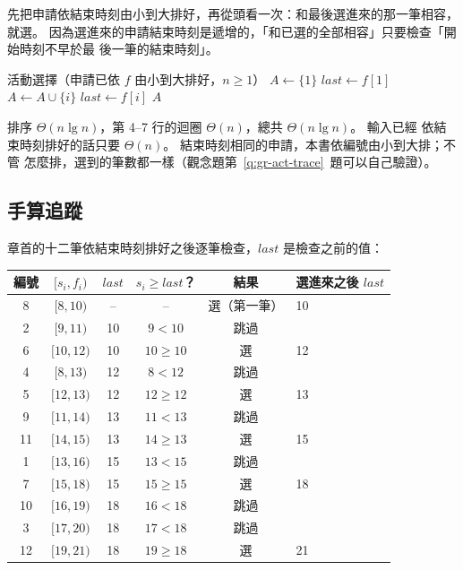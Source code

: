 先把申請依結束時刻由小到大排好，再從頭看一次：和最後選進來的那一筆相容，就選。
因為選進來的申請結束時刻是遞增的，「和已選的全部相容」只要檢查「開始時刻不早於最
後一筆的結束時刻」。

\begin{pseudo}[label=alg:gr-activity]{活動選擇（申請已依 $f$ 由小到大排好，$n \ge 1$）}
    \State $A \gets \{1\}$
    \State $\mathit{last} \gets f[1]$ 
            \State $A \gets A \cup \{i\}$
            \State $\mathit{last} \gets f[i]$
        \EndIf
    \EndFor
    \State \Return $A$
\EndFunction
\end{pseudo}

排序 $\Theta(n \lg n)$，第 4--7 行的迴圈 $\Theta(n)$，總共 $\Theta(n \lg n)$。 輸入已經
依結束時刻排好的話只要 $\Theta(n)$。 結束時刻相同的申請，本書依編號由小到大排；不管
怎麼排，選到的筆數都一樣（觀念題第~\ref{q:gr-act-trace}~題可以自己驗證）。

\subsection{手算追蹤}

章首的十二筆依結束時刻排好之後逐筆檢查，$\mathit{last}$ 是檢查之前的值：

\begin{center}
\begin{tabular}{cccccl}
\toprule
編號 & $[s_i, f_i)$ & $\mathit{last}$ & $s_i \ge \mathit{last}$？ & 結果 & 選進來之後 $\mathit{last}$ \\
\midrule
8 & $[8, 10)$ & -- & -- & 選（第一筆） & 10 \\
2 & $[9, 11)$ & 10 & $9 < 10$ & 跳過 & \\
6 & $[10, 12)$ & 10 & $10 \ge 10$ & 選 & 12 \\
4 & $[8, 13)$ & 12 & $8 < 12$ & 跳過 & \\
5 & $[12, 13)$ & 12 & $12 \ge 12$ & 選 & 13 \\
9 & $[11, 14)$ & 13 & $11 < 13$ & 跳過 & \\
11 & $[14, 15)$ & 13 & $14 \ge 13$ & 選 & 15 \\
1 & $[13, 16)$ & 15 & $13 < 15$ & 跳過 & \\
7 & $[15, 18)$ & 15 & $15 \ge 15$ & 選 & 18 \\
10 & $[16, 19)$ & 18 & $16 < 18$ & 跳過 & \\
3 & $[17, 20)$ & 18 & $17 < 18$ & 跳過 & \\
12 & $[19, 21)$ & 18 & $19 \ge 18$ & 選 & 21 \\
\bottomrule
\end{tabular}
\end{center}

